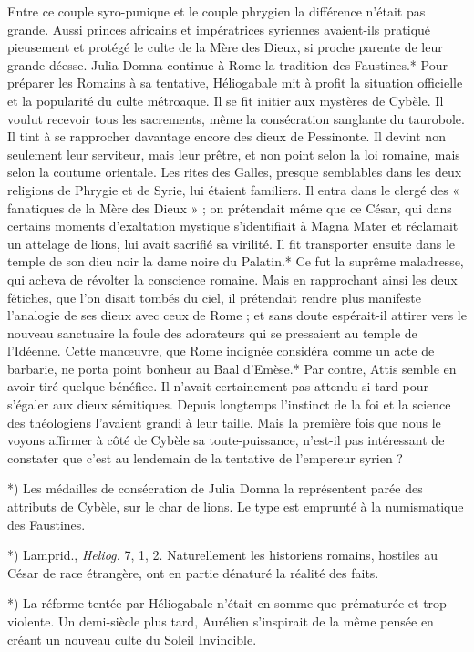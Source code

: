 \documentclass[a4paper, 11pt, oneside, polutonikogreek, french]{article}
\begin{document}
Entre ce couple syro-punique et le couple phrygien la différence n'était pas grande. Aussi princes africains et impératrices syriennes avaient-ils pratiqué pieusement et protégé le culte de la Mère des Dieux, si proche parente de leur grande déesse. Julia Domna continue à Rome la tradition des Faustines.* Pour préparer les Romains à sa tentative, Héliogabale mit à profit la situation officielle et la popularité du culte métroaque. Il se fit initier aux mystères de Cybèle. Il voulut recevoir tous les sacrements, même la consécration sanglante du taurobole. Il tint à se rapprocher davantage encore des dieux de Pessinonte. Il devint non seulement leur serviteur, mais leur prêtre, et non point selon la loi romaine, mais selon la coutume orientale. Les rites des Galles, presque semblables dans les deux religions de Phrygie et de Syrie, lui étaient familiers. Il entra dans le clergé des « fanatiques de la Mère des Dieux » ; on prétendait même que ce César, qui dans certains moments d'exaltation mystique s'identifiait à Magna Mater et réclamait un attelage de lions, lui avait sacrifié sa virilité. Il fit transporter ensuite dans le temple de son dieu noir la dame noire du Palatin.* Ce fut la suprême maladresse, qui acheva de révolter la conscience romaine. Mais en rapprochant ainsi les deux fétiches, que l'on disait tombés du ciel, il prétendait rendre plus manifeste l'analogie de ses dieux avec ceux de Rome ; et sans doute espérait-il attirer vers le nouveau sanctuaire la foule des adorateurs qui se pressaient au temple de l'Idéenne. Cette manœuvre, que Rome indignée considéra comme un acte de barbarie, ne porta point bonheur au Baal d'Emèse.* Par contre, Attis semble en avoir tiré quelque bénéfice. Il n'avait certainement pas attendu si tard pour s'égaler aux dieux sémitiques. Depuis longtemps l'instinct de la foi et la science des théologiens l'avaient grandi à leur taille. Mais la première fois que nous le voyons affirmer à côté de Cybèle sa toute-puissance, n'est-il pas intéressant de constater que c'est au lendemain de la tentative de l'empereur syrien ?

*) Les médailles de consécration de Julia Domna la représentent parée des attributs de Cybèle, sur le char de lions. Le type est emprunté à la numismatique des Faustines.

*) Lamprid., \emph{Heliog.} 7, 1, 2. Naturellement les historiens romains, hostiles au César de race étrangère, ont en partie dénaturé la réalité des faits.

*) La réforme tentée par Héliogabale n'était en somme que prématurée et trop violente. Un demi-siècle plus tard, Aurélien s'inspirait de la même pensée en créant un nouveau culte du Soleil Invincible.
\clearpage
\end{document}

